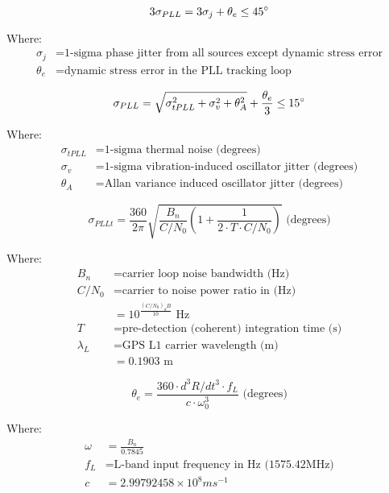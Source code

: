 \begin{equation}
3 \sigma_{PLL} = 3 \sigma_j +\theta_e \leq 45 \degree
\end{equation}

Where:
\begin{align*}
\sigma_j &= \text{1-sigma phase jitter from all sources except dynamic stress error} \\
\theta_e &= \text{dynamic stress error in the PLL tracking loop}
\end{align*}

\begin{equation}
\sigma_{PLL} = \sqrt{\sigma^2_{tPLL} + \sigma^2_v+ \theta^2_A} + \frac{\theta_e}{3} \leq 15 \degree 
\end{equation}

Where:
\begin{align*}
\sigma_{tPLL} &= \text{1-sigma thermal noise (degrees)}\\
\sigma_v &= \text{1-sigma vibration-induced oscillator jitter (degrees)}\\
\theta_A &= \text{Allan variance induced oscillator jitter (degrees)}
\end{align*}


\begin{equation}
\sigma_{PLLt} = \frac{360}{2 \pi} \sqrt{\frac{B_n}{C/N_0}(1+\frac{1}{2 \cdot T \cdot C/N_0})} \text{ (degrees)}
\end{equation}

Where:
\begin{align*}
B_n &= \text{carrier loop noise bandwidth (Hz)} \\
C/N_0 &= \text{carrier to noise power ratio in (Hz)} \\
&=10^\frac{(C/N_0)_dB}{10} \text{ Hz}\\
T &= \text{pre-detection (coherent) integration time (s)} \\
\lambda_L &= \text{GPS L1 carrier wavelength (m)}\\
&= 0.1903 \text{ m}
\end{align*}


\begin{equation}
\theta_e = \frac{360 \cdot d^3R/dt^3  \cdot f_L}{c  \cdot \omega^3_0} \text{ (degrees)}
\end{equation}


Where:
\begin{align*}
\omega &= \frac{B_n}{0.7845} \\
f_L &= \text{L-band input frequency in Hz (1575.42MHz)}\\ 
c & = 2.99792458 \times 10^8 ms^{-1}
\end{align*}




